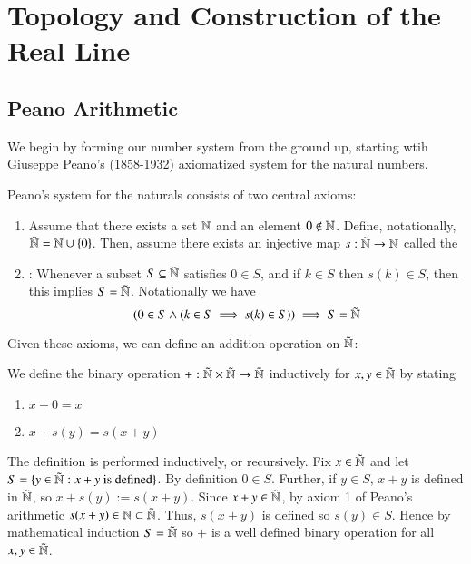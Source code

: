 \chapter{Topology and Construction of the Real Line}


\section{Peano Arithmetic}

We begin by forming our number system from the ground up, starting wtih Giuseppe Peano's (1858-1932) axiomatized system for the natural numbers.

\begin{axi}
    Peano's system for the naturals consists of two central axioms: \begin{enumerate}
        \item Assume that there exists a set $\mathbb N$ and an element $0 \notin \mathbb N$. Define, notationally, $\tilde{\mathbb N} = \mathbb N\cup\{0\}$. Then, assume there exists an injective map $s:\tilde{\mathbb N}\rightarrow \mathbb N$ called the 
        \item {}: Whenever a subset $S \subseteq \tilde{\mathbb N}$ satisfies $0 \in S$, and if $k \in S$ then $s(k) \in S$, then this implies $S = \tilde{\mathbb N}$. Notationally we have $$(0 \in S \land (k \in S \implies s(k) \in S)) \implies S = \tilde{\mathbb N}$$
    \end{enumerate}
\end{axi}

Given these axioms, we can define an addition operation on $\tilde{\mathbb N}$:
\begin{defn}
    We define the binary operation $+:\tilde{\mathbb N}\times\tilde{\mathbb N}\rightarrow\tilde{\mathbb N}$ inductively for $x,y \in \tilde{\mathbb N}$ by stating \begin{enumerate}
        \item $x + 0 = x$ 
        \item $x + s(y) = s(x+y)$ 
    \end{enumerate}
\end{defn}

The definition is performed inductively, or recursively. Fix $x \in \tilde{\mathbb N}$ and let $S = \{y \in \tilde{\mathbb N}:x+y\text{ is defined}\}$. By definition $0 \in S$. Further, if $y \in S$, $x+y$ is defined in $\tilde{\mathbb N}$, so $x+s(y) := s(x+y)$. Since $x+y \in \tilde{\mathbb N}$, by axiom 1 of Peano's arithmetic $s(x+y) \in \mathbb N\subset \tilde{\mathbb N}$. Thus, $s(x+y)$ is defined so $s(y) \in S$. Hence by mathematical induction $S = \tilde{\mathbb N}$ so $+$ is a well defined binary operation for all $x,y \in \tilde{\mathbb N}$.

